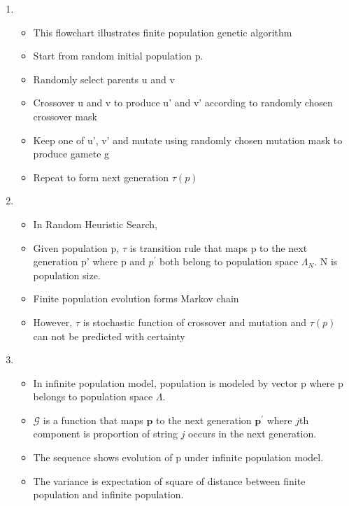 \documentclass{article}
\begin{document}
\begin{enumerate}
\item
  \begin{itemize}
  \item This flowchart illustrates finite population genetic algorithm
  \item Start from random initial population p.
  \item Randomly select parents u and v 
  \item Crossover u and v to produce u' and v' according to randomly chosen crossover mask
  \item Keep one of u', v' and mutate using randomly chosen mutation mask to produce gamete g
  \item Repeat to form next generation $\tau(p)$
  \end{itemize}
  
\item
  \begin{itemize}
  \item In Random Heuristic Search,
  \item Given population p, $\tau$ is transition rule that maps p to
    the next generation p' where p and $p^\prime$ both belong to population space $\Lambda_N$.
    N is population size. 
  \item Finite population evolution forms
    Markov chain
  \item However, $\tau$ is stochastic function of crossover and
    mutation and $\tau(p)$ can not be predicted with
    certainty 
  \end{itemize}
    
\item
  \begin{itemize}
  \item In infinite population model, population is modeled by vector p where p belongs to population space $\Lambda$.    
  \item $\mathcal{G}$ is a function that maps $\bm{p}$ to the next
    generation $\bm{p}^\prime$ where $j$th component is proportion of string $j$
    occurs in the next generation.
  \item The sequence shows evolution of p under infinite population
    model.
  \item The variance is expectation of square of distance between finite population and infinite population.
  \end{itemize}
    

\end{enumerate}
\end{document}
